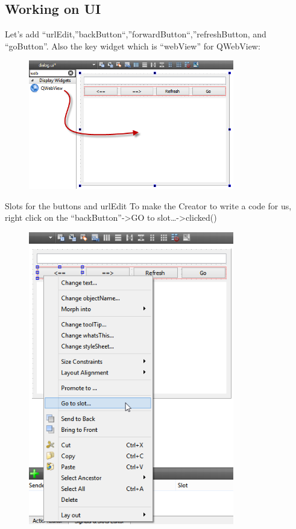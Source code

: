 \subsection{Working on UI}\label{working-on-ui}

Let's add ``urlEdit,''backButton``,''forwardButton``,''refreshButton,
and ``goButton''. Also the key widget which is ``webView'' for QWebView:

\begin{figure}[htbp]
\centering
\includegraphics[width=0.8\textwidth]{images/AddingWebView.png}
\caption{}
\end{figure}

Slots for the buttons and urlEdit To make the Creator to write a code
for us, right click on the ``backButton''-\textgreater{}GO to
slot\ldots{}-\textgreater{}clicked()

\begin{figure}[htbp]
\centering
\includegraphics[width=0.8\textwidth]{images/GoToSlotBrowser.png}
\caption{}
\end{figure}

